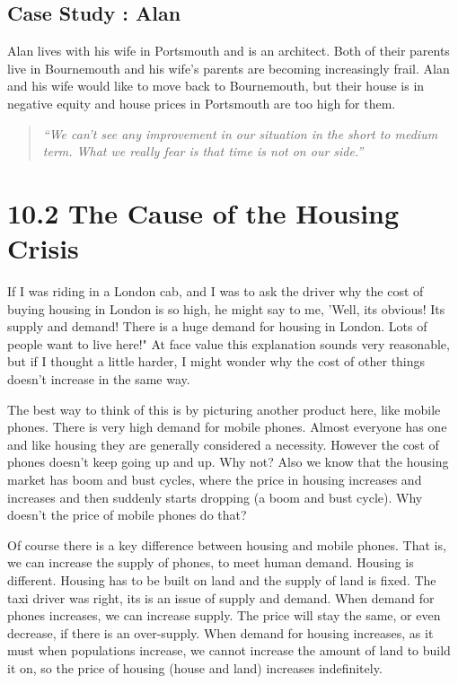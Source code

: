 \documentclass[]{tufte-handout}
\begin{document}
\hypertarget{case-study-alan}{%
\subsection{Case Study : Alan}\label{case-study-alan}}

Alan lives with his wife in Portsmouth and is an architect. Both of
their parents live in Bournemouth and his wife's parents are becoming
increasingly frail. Alan and his wife would like to move back to
Bournemouth, but their house is in negative equity and house prices in
Portsmouth are too high for them.

\begin{quote}
\emph{``We can't see any improvement in our situation in the short to
medium term. What we really fear is that time is not on our side.''}
\end{quote}

\hypertarget{the-cause-of-the-housing-crisis}{%
\section{10.2 The Cause of the Housing
Crisis}\label{the-cause-of-the-housing-crisis}}

If I was riding in a London cab, and I was to ask the driver why the
cost of buying housing in London is so high, he might say to me, 'Well,
its obvious! Its supply and demand! There is a huge demand for housing
in London. Lots of people want to live here!" At face value this
explanation sounds very reasonable, but if I thought a little harder, I
might wonder why the cost of other things doesn't increase in the same
way.

The best way to think of this is by picturing another product here, like
mobile phones. There is very high demand for mobile phones. Almost
everyone has one and like housing they are generally considered a
necessity. However the cost of phones doesn't keep going up and up. Why
not? Also we know that the housing market has boom and bust cycles,
where the price in housing increases and increases and then suddenly
starts dropping (a boom and bust cycle). Why doesn't the price of mobile
phones do that?

Of course there is a key difference between housing and mobile phones.
That is, we can increase the supply of phones, to meet human demand.
Housing is different. Housing has to be built on land and the supply of
land is fixed. The taxi driver was right, its is an issue of supply and
demand. When demand for phones increases, we can increase supply. The
price will stay the same, or even decrease, if there is an over-supply.
When demand for housing increases, as it must when populations increase,
we cannot increase the amount of land to build it on, so the price of
housing (house and land) increases indefinitely.
\end{document}
